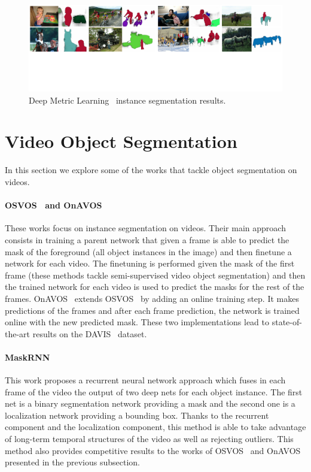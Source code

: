 \begin{figure}[h]
  \centering
  \includegraphics[width=1.\linewidth]{figures/deep_metric_learning/mask_classification.pdf}
  \caption{Deep Metric Learning~\deepml{} instance segmentation results. }
  \label{fig:deep_metric_learning}
\end{figure}

\section{Video Object Segmentation}
\label{sec:soa:videoobjectsegmentation}

In this section we explore some of the works that tackle object segmentation on videos.

\paragraph{OSVOS~\osvos{} and OnAVOS~\onavos{}}
These works focus on instance segmentation on videos.
Their main approach consists in training a parent network that given a frame is able to predict the mask of the foreground (all object instances in the image) and then finetune a network for each video.
The finetuning is performed given the mask of the first frame (these methods tackle semi-supervised video object segmentation) and then the trained network for each video is used to predict the masks for the rest of the frames.
OnAVOS~\onavos{} extends OSVOS~\osvos{} by adding an online training step.
It makes predictions of the frames and after each frame prediction, the network is trained online with the new predicted mask.
These two implementations lead to state-of-the-art results on the DAVIS~\davisboth{} dataset.

\paragraph{MaskRNN~\maskrnn{}}
This work proposes a recurrent neural network approach which fuses in each frame of the video the output of two deep nets for each object instance.
The first net is a binary segmentation network providing a mask and the second one is a localization network providing a bounding box.
Thanks to the recurrent component and the localization component, this method is able to take advantage of long-term temporal structures of the video as well as rejecting outliers.
This method also provides competitive results to the works of OSVOS~\osvos{} and OnAVOS~\onavos{} presented in the previous subsection.
